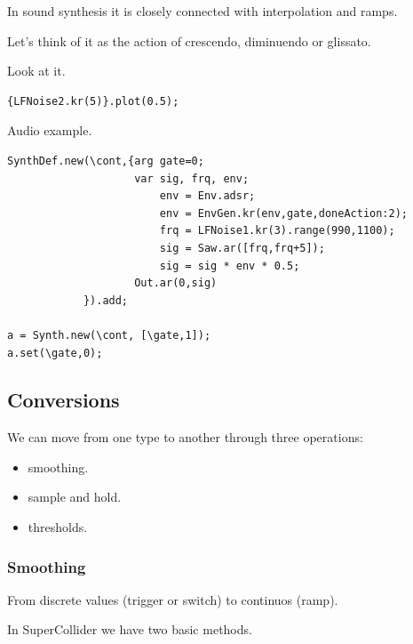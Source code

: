 In sound synthesis it is closely connected with interpolation and ramps.

Let's think of it as the action of crescendo, diminuendo or glissato.

Look at it.

\begin{lstlisting}[frame=single] 
{LFNoise2.kr(5)}.plot(0.5); 
\end{lstlisting}

Audio example.

\begin{lstlisting}[frame=single] 
SynthDef.new(\cont,{arg gate=0;
                    var sig, frq, env;
                        env = Env.adsr;
                        env = EnvGen.kr(env,gate,doneAction:2);
                        frq = LFNoise1.kr(3).range(990,1100);
                        sig = Saw.ar([frq,frq+5]);
                        sig = sig * env * 0.5;
                    Out.ar(0,sig)
            }).add;
 
a = Synth.new(\cont, [\gate,1]);
a.set(\gate,0);        
\end{lstlisting}

\subsection{Conversions}\label{conversions}

We can move from one type to another through three operations:

\begin{itemize}
\tightlist
\item smoothing. 
\item sample and hold.
\item thresholds.
\end{itemize}

\subsubsection{Smoothing}\label{smoothing}

From discrete values (trigger or switch) to continuos (ramp).

In SuperCollider we have two basic methods.


